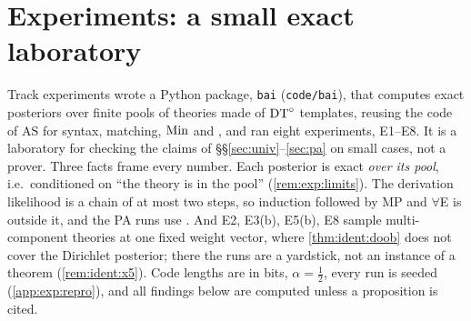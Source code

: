 \providecommand{\expbrk}{\hfil\penalty0\hfilneg}
\providecommand{\expth}[1]{\textsf{#1}}
\providecommand{\expgen}[1]{\textit{#1}}

\section{Experiments: a small exact laboratory}\label{sec:exp}

Track experiments wrote a Python package, \texttt{bai} (\texttt{code/bai}), that computes exact posteriors over finite pools of theories made of $\mathrm{DT}^{\circ}$ templates, reusing the code of AS \citep{claude2026axiomschemas} for syntax, matching, $\mathrm{Min}$ and \DTRC, and ran eight experiments, E1--E8. It is a laboratory for checking the claims of \S\S\ref{sec:univ}--\ref{sec:pa} on small cases, not a prover. Three facts frame every number. Each posterior is exact \emph{over its pool}, i.e.\ conditioned on ``the theory is in the pool'' (\cref{rem:exp:limits}). The derivation likelihood is a chain of at most two steps, so induction followed by MP and $\forall$E is outside it, and the PA runs use \Lzero. And E2, E3(b), E5(b), E8 sample multi-component theories at one fixed weight vector, where \cref{thm:ident:doob} does not cover the Dirichlet posterior; there the runs are a yardstick, not an instance of a theorem (\cref{rem:ident:x5}). Code lengths are in bits, $\alpha=\tfrac12$, every run is seeded (\cref{app:exp:repro}), and all findings below are computed unless a proposition is cited.

